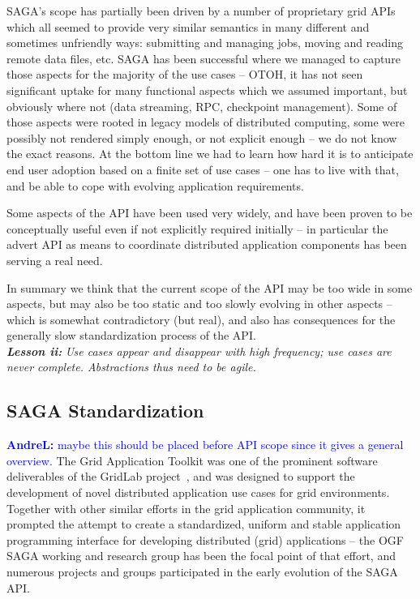 \documentclass{article}
\newcommand{\I}[1]{\textit{#1}}
\newcommand{\B}[1]{\textbf{#1}}
\newcommand{\BI}[1]{\textbf{\textit{#1}}}
\newcommand{\alnote}[1]{{\textcolor{blue}{    \B{AndreL:  } #1 }}}
\newcommand{\alnote}[1]{}
\begin{document}
  SAGA's scope has partially been driven by a number of proprietary
  grid APIs which all seemed to provide very similar semantics in many
  different and sometimes unfriendly ways: submitting and managing
  jobs, moving and reading remote data files, etc.  SAGA has been
  successful where we managed to capture those aspects for the
  majority of the use cases -- OTOH, it has not seen significant
  uptake for many functional aspects which we assumed important, but
  obviously where not (data streaming, RPC, checkpoint management).
  Some of those aspects were rooted in legacy models of distributed
  computing, some were possibly not rendered simply enough, or not
  explicit enough -- we do not know the exact reasons.  At the bottom
  line we had to learn how hard it is to anticipate end user adoption
  based on a finite set of use cases -- one has to live with that, and
  be able to cope with evolving application requirements.

  Some aspects of the API have been used very widely, and have been
  proven to be conceptually useful even if not explicitly required
  initially -- in particular the advert API as means to coordinate
  distributed application components has been serving a real need.

  In summary we think that the current scope of the API may be too
  wide in some aspects, but may also be too static and too slowly
  evolving in other aspects -- which is somewhat contradictory (but
  real), and also has consequences for the generally slow
  standardization process of the API.\\
  \BI{Lesson ii:} \I{Use cases appear and disappear with high frequency;
  use cases are never complete.  Abstractions thus need to be agile.}


 \subsection{SAGA Standardization}

  \alnote{maybe this should be placed before API scope since it gives a 
  general overview.}
  The Grid Application Toolkit was one of the prominent software
  deliverables of the GridLab project~\cite{gridlab}, and was designed
  to support the development of novel distributed application use
  cases for grid environments.  Together with other similar efforts in
  the grid application community, it prompted the attempt to create
  a standardized, uniform and stable application programming interface
  for developing distributed (grid) applications -- the OGF SAGA
  working and research group has been the focal point of that effort,
  and numerous projects and groups participated in the early
  evolution of the SAGA API.  
\end{document}
